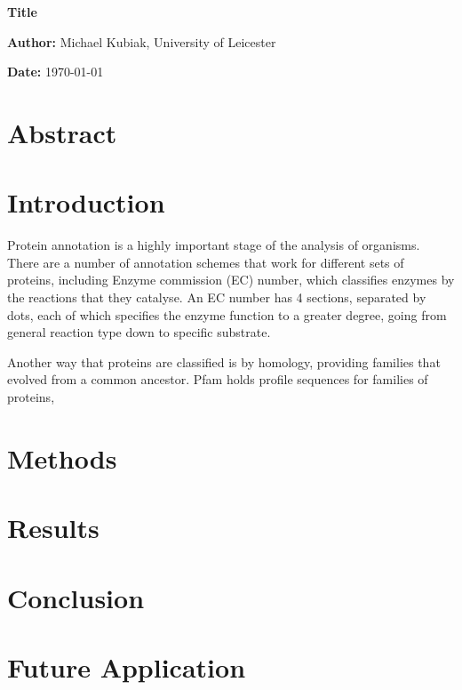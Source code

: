 \documentclass{article}
\begin{document}
	\vspace*{\fill}
		\begin{center}
			\huge\textbf{Title}
			
			\large\textbf{Author:} Michael Kubiak, University of Leicester
	
			\textbf{Date:} \today
			
		
		\end{center}
	\vspace*{\fill}

\pagebreak

	\section*{Abstract}

\pagebreak

	\tableofcontents

\pagebreak

	\section*{Introduction}
		Protein annotation is a highly important stage of the analysis of organisms.  There are a number of annotation schemes that work for different sets of proteins, including Enzyme commission (EC) number, which classifies enzymes by the reactions that they catalyse.  An EC number has 4 sections, separated by dots, each of which specifies the enzyme function to a greater degree, going from general reaction type down to specific substrate.  
		
		Another way that proteins are classified is by homology, providing families that evolved from a common ancestor.  Pfam \citep{RefWorks:doc:5d6e641de4b0a51fb0eed90f} holds profile sequences for families of proteins,  
		
	\section{Methods}
			
			
				
							
				  
	\section{Results}
		
				
	\section{Conclusion}
		
	\section{Future Application}
			
\pagebreak

	{}
	
\end{document}
